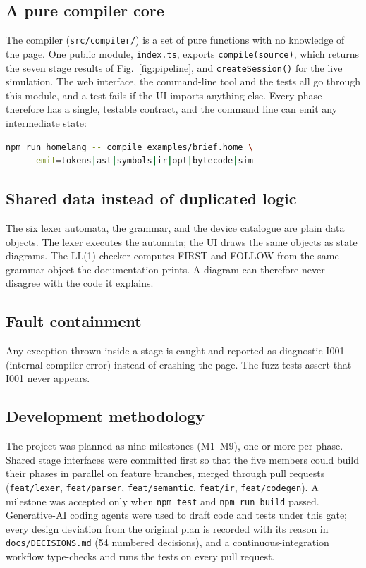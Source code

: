 \documentclass[conference]{IEEEtran}
\newcommand{\code}[1]{\texttt{#1}}
\begin{document}
\subsection{A pure compiler core}
The compiler (\code{src/compiler/}) is a set of pure functions with no knowledge of the page. One public module, \code{index.ts}, exports \code{compile(source)}, which returns the seven stage results of Fig.~\ref{fig:pipeline}, and \code{createSession()} for the live simulation. The web interface, the command-line tool and the tests all go through this module, and a test fails if the UI imports anything else. Every phase therefore has a single, testable contract, and the command line can emit any intermediate state:
\begin{lstlisting}[language=bash]
npm run homelang -- compile examples/brief.home \
    --emit=tokens|ast|symbols|ir|opt|bytecode|sim
\end{lstlisting}

\subsection{Shared data instead of duplicated logic}
The six lexer automata, the grammar, and the device catalogue are plain data objects. The lexer executes the automata; the UI draws the same objects as state diagrams. The LL(1) checker computes FIRST and FOLLOW from the same grammar object the documentation prints. A diagram can therefore never disagree with the code it explains.

\subsection{Fault containment}
Any exception thrown inside a stage is caught and reported as diagnostic I001 (internal compiler error) instead of crashing the page. The fuzz tests assert that I001 never appears.

\subsection{Development methodology}
The project was planned as nine milestones (M1--M9), one or more per phase. Shared stage interfaces were committed first so that the five members could build their phases in parallel on feature branches, merged through pull requests (\code{feat/lexer}, \code{feat/parser}, \code{feat/semantic}, \code{feat/ir}, \code{feat/codegen}). A milestone was accepted only when \code{npm test} and \code{npm run build} passed. Generative-AI coding agents were used to draft code and tests under this gate; every design deviation from the original plan is recorded with its reason in \code{docs/DECISIONS.md} (54 numbered decisions), and a continuous-integration workflow type-checks and runs the tests on every pull request.
\end{document}
